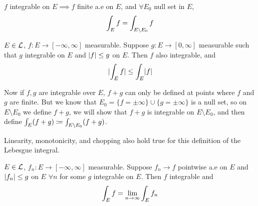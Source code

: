\begin{prop}
    $f$ integrable on $E \implies f $ finite a.e on $E$, and $\forall E_0 $ null set in $E$,
    \[
        \int_{E} f = \int_{E \setminus E_0} f
    \]
\end{prop}

\begin{prop}
    $E \in \mathcal{L}$, $f: E \rightarrow [-\infty, \infty]$ measurable.
    Suppose $g: E \rightarrow [0,\infty]$ measurable such that $g$ integrable on $E$ and $\lvert f\rvert \leq g$ on $E$.
    Then $f$ also integrable, and
    \[
        \lvert \int_{E} f \rvert \leq \int_{E} \lvert f\rvert
    \]
\end{prop}

Now if $f,g$ are integrable over $E$, $f+g$ can only be defined at points where $f$ and $g$ are finite.
But we know that $E_0 = \{ f = \pm \infty \} \cup \{ g = \pm \infty \}$ is a null set, so on $E \setminus E_0$ we define $f+g$, we will show that $f+g$ is integrable on $E\setminus E_0$, and then define $\int_{E} (f+g) \coloneqq \int_{E \setminus E_0} (f+g)$.

Linearity, monotonicity, and chopping also hold true for this definition of the Lebesgue integral.

\begin{theorem}
    $E \in \mathcal{L}$, $f_n: E \rightarrow [-\infty, \infty]$ measurable.
    Suppose $f_n \rightarrow f$ pointwise a.e on $E$ and $\lvert f_n\rvert \leq g$ on $E$ $\forall n$ for some $g$ integrable on $E$.
    Then $f$ integrable and
    \[
        \int_{E} f = \lim_{n \rightarrow \infty} \int_{E} f_n
    \]
\end{theorem}